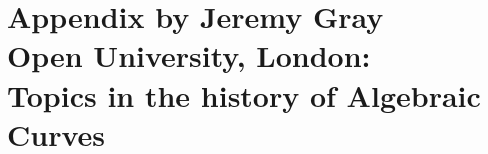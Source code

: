 %      
%
%
%
%
%
%
\def\jg#1{{{\bf {***}Jeremy says }#1}}
\newcommand{\ha}{\frac{1}{2}}

%



\chapter{Appendix by Jeremy Gray\\ Open University, London:\\
\bigskip Topics in the history of Algebraic Curves\\ \medskip
}
\label{Appendix-History}

